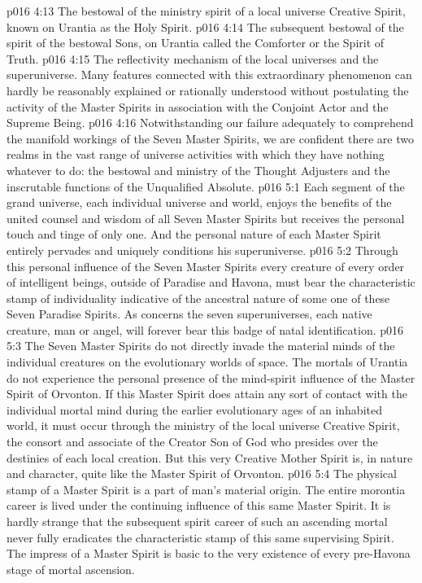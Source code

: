 \vs p016 4:13 \bibnobreakspace The bestowal of the ministry spirit of a local universe Creative Spirit, known on Urantia as the Holy Spirit.
\vs p016 4:14 \bibnobreakspace The subsequent bestowal of the spirit of the bestowal Sons, on Urantia called the Comforter or the Spirit of Truth.
\vs p016 4:15 \bibnobreakspace The reflectivity mechanism of the local universes and the superuniverse. Many features connected with this extraordinary phenomenon can hardly be reasonably explained or rationally understood without postulating the activity of the Master Spirits in association with the Conjoint Actor and the Supreme Being.
\vs p016 4:16 \pc Notwithstanding our failure adequately to comprehend the manifold workings of the Seven Master Spirits, we are confident there are two realms in the vast range of universe activities with which they have nothing whatever to do: the bestowal and ministry of the Thought Adjusters and the inscrutable functions of the Unqualified Absolute.
\vs p016 5:1 Each segment of the grand universe, each individual universe and world, enjoys the benefits of the united counsel and wisdom of all Seven Master Spirits but receives the personal touch and tinge of only one. And the personal nature of each Master Spirit entirely pervades and uniquely conditions his superuniverse.
\vs p016 5:2 Through this personal influence of the Seven Master Spirits every creature of every order of intelligent beings, outside of Paradise and Havona, must bear the characteristic stamp of individuality indicative of the ancestral nature of some one of these Seven Paradise Spirits. As concerns the seven superuniverses, each native creature, man or angel, will forever bear this badge of natal identification.
\vs p016 5:3 The Seven Master Spirits do not directly invade the material minds of the individual creatures on the evolutionary worlds of space. The mortals of Urantia do not experience the personal presence of the mind\hyp{}spirit influence of the Master Spirit of Orvonton. If this Master Spirit does attain any sort of contact with the individual mortal mind during the earlier evolutionary ages of an inhabited world, it must occur through the ministry of the local universe Creative Spirit, the consort and associate of the Creator Son of God who presides over the destinies of each local creation. But this very Creative Mother Spirit is, in nature and character, quite like the Master Spirit of Orvonton.
\vs p016 5:4 The physical stamp of a Master Spirit is a part of man’s material origin. The entire morontia career is lived under the continuing influence of this same Master Spirit. It is hardly strange that the subsequent spirit career of such an ascending mortal never fully eradicates the characteristic stamp of this same supervising Spirit. The impress of a Master Spirit is basic to the very existence of every pre\hyp{}Havona stage of mortal ascension.

